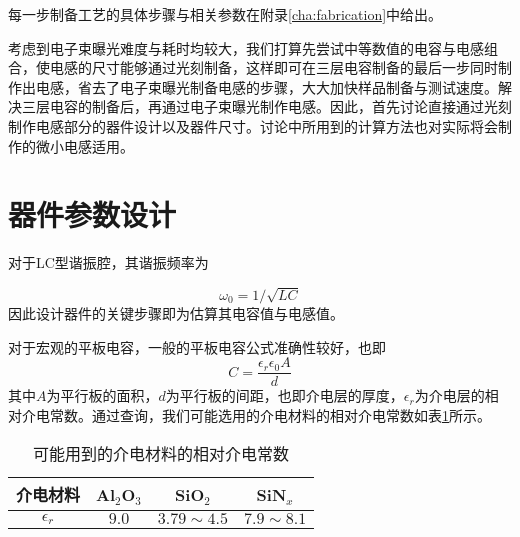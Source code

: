             每一步制备工艺的具体步骤与相关参数在附录\ref{cha:fabrication}中给出。

            考虑到电子束曝光难度与耗时均较大，我们打算先尝试中等数值的电容与电感组合，使电感的尺寸能够通过光刻制备，这样即可在三层电容制备的最后一步同时制作出电感，省去了电子束曝光制备电感的步骤，大大加快样品制备与测试速度。解决三层电容的制备后，再通过电子束曝光制作电感。因此，首先讨论直接通过光刻制作电感部分的器件设计以及器件尺寸。讨论中所用到的计算方法也对实际将会制作的微小电感适用。
            


        \section{器件参数设计} %
        \label{sec:器件参数设计}

            对于LC型谐振腔，其谐振频率为

            \begin{equation}
                \omega_0 = 1/\sqrt{LC}
            \end{equation}
            因此设计器件的关键步骤即为估算其电容值与电感值。

            对于宏观的平板电容，一般的平板电容公式准确性较好，也即
            \begin{equation}
                C = \frac{\epsilon_r \epsilon_0 A }{d}
            \end{equation}
            其中$A$为平行板的面积，$d$为平行板的间距，也即介电层的厚度，$\epsilon_r $为介电层的相对介电常数。通过查询，我们可能选用的介电材料的相对介电常数\cite{cardarelli2008materials}如表\ref{tab:dielectricConstants}所示。


\begin{table}[htb]
  \centering
  \caption{可能用到的介电材料的相对介电常数\cite{cardarelli2008materials}}
  \label{tab:dielectricConstants}
    \begin{tabular}{c|ccc} %
      \toprule %
      介电材料& Al$_2$O$_3$ & SiO$_2$ & SiN$_x$ \\
      \midrule %
      $\epsilon_r $ & $9.0$ & $3.79\sim 4.5$ & $ 7.9\sim 8.1 $  \\
      \bottomrule %
    \end{tabular}
\end{table}
            

